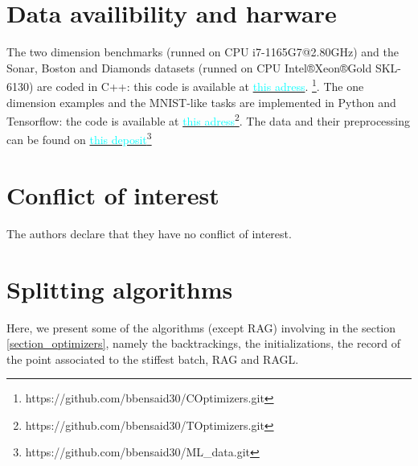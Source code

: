 \section*{Data availibility and harware}
The two dimension benchmarks (runned on CPU i7-1165G7@2.80GHz) and the Sonar, Boston and Diamonds datasets (runned on CPU Intel®Xeon®Gold SKL-6130) are coded in C++: this code is available at \href{https://github.com/bbensaid30/COptimizers.git}{\textcolor{cyan}{this adress}}.	\footnote{https://github.com/bbensaid30/COptimizers.git}. The one dimension examples and the MNIST-like tasks are implemented in Python and Tensorflow: the code is available at \href {https://github.com/bbensaid30/TOptimizers.git}{\textcolor{cyan}{this adress}}\footnote{https://github.com/bbensaid30/TOptimizers.git}. The data and their preprocessing can be found on \href{https://github.com/bbensaid30/ML_data.git}{\textcolor{cyan}{this deposit}}\footnote{https://github.com/bbensaid30/ML\_data.git}

\section*{Conflict of interest}
The authors declare that they have no conflict of interest.

\newpage

\appendix



\section{Splitting algorithms}
\label{annexe_algo}

Here, we present some of the algorithms (except RAG) involving in the section \ref{section_optimizers}, namely the backtrackings, the initializations, the record of the point associated to the stiffest batch, RAG and RAGL. 

